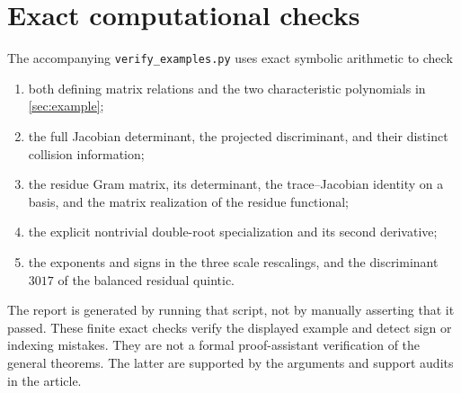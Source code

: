 \documentclass[11pt]{article}
\theoremstyle{definition}
\begin{document}
\section{Exact computational checks}\label{app:checks}
The accompanying \texttt{verify\_examples.py} uses exact symbolic arithmetic to check
\begin{enumerate}
\item both defining matrix relations and the two characteristic polynomials in \cref{sec:example};
\item the full Jacobian determinant, the projected discriminant, and their distinct collision information;
\item the residue Gram matrix, its determinant, the trace--Jacobian identity on a basis, and the matrix realization of the residue functional;
\item the explicit nontrivial double-root specialization and its second derivative;
\item the exponents and signs in the three scale rescalings, and the discriminant $3017$ of the balanced residual quintic.
\end{enumerate}
The report is generated by running that script, not by manually asserting that it passed. These finite exact checks verify the displayed example and detect sign or indexing mistakes. They are not a formal proof-assistant verification of the general theorems. The latter are supported by the arguments and support audits in the article.
\end{document}
